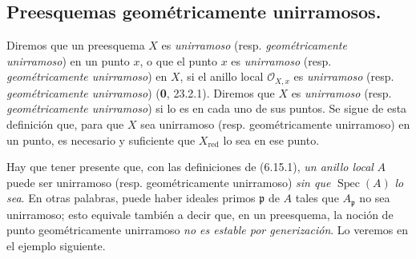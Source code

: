 \subsection{Preesquemas geométricamente unirramosos.}
\label{IV.2.s6.15-fr}

\begin{env}[6.15.1]
\label{IV.2.s6.15.1-fr}
Diremos que un preesquema $X$ es \emph{unirramoso} (resp.
\emph{geométricamente unirramoso}) en un punto $x$, o que el
punto $x$ es \emph{unirramoso} (resp. \emph{geométricamente unirramoso}) en $X$,
si el anillo local $\mathcal O_{X,x}$ es \emph{unirramoso} (resp.
\emph{geométricamente unirramoso}) (\textbf 0, 23.2.1). Diremos que $X$ es
\emph{unirramoso} (resp. \emph{geométricamente unirramoso}) si lo es en cada
uno de sus puntos. Se sigue de esta definición que, para que $X$
sea unirramoso (resp. geométricamente unirramoso) en un punto,
es necesario y suficiente que $X_{\mathrm{red}}$ lo sea en ese
punto.
\end{env}

\begin{env}[6.15.2]
Hay que tener presente que, con las definiciones de (6.15.1),
\emph{un anillo local} $A$ puede ser unirramoso (resp. geométricamente
unirramoso) \emph{sin que} $\operatorname{Spec}(A)$ \emph{lo sea}. En otras
palabras, puede haber ideales primos $\mathfrak p$ de $A$ tales
que $A_\mathfrak p$ no sea unirramoso; esto equivale también a
decir que, en un preesquema, la noción de punto geométricamente
unirramoso \emph{no es estable por generización}. Lo veremos en el
ejemplo siguiente.
\end{env}
